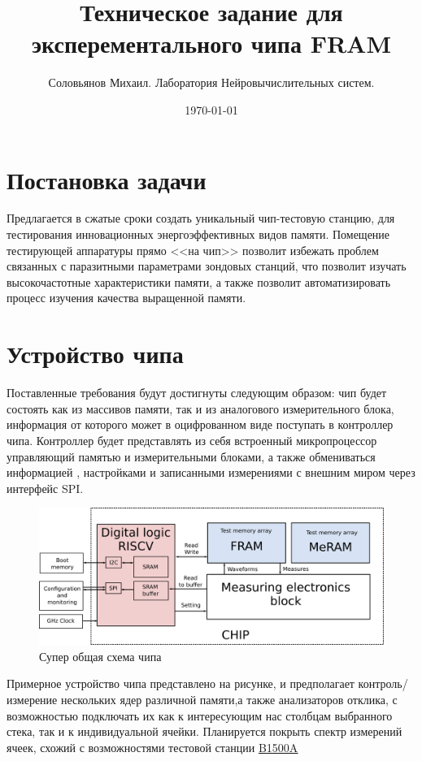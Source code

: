 \documentclass[a4paper,12pt]{article} %
\author{Соловьянов Михаил. Лаборатория Нейровычислительных систем.}
\title{Техническое задание для эксперементального чипа FRAM}
\date{\today}
\newcommand{\link}[2]{\underline{\href{#1}{#2} }}
\begin{document}
\thispagestyle{fancy}
\maketitle



\section{ Постановка задачи}


Предлагается в сжатые сроки создать уникальный чип-тестовую станцию, для тестирования инновационных энергоэффективных видов памяти. Помещение тестирующей аппаратуры прямо <<на чип>> позволит избежать проблем связанных с паразитными  параметрами зондовых станций, что позволит изучать высокочастотные характеристики памяти, а также позволит автоматизировать процесс изучения качества выращенной памяти. 

\section{Устройство чипа}

Поставленные требования будут достигнуты следующим образом: чип будет состоять как из массивов памяти, так и из аналогового измерительного блока, информация от которого может в оцифрованном виде поступать в контроллер чипа. Контроллер будет представлять из себя встроенный микропроцессор управляющий памятью и измерительными блоками, а также обмениваться информацией , настройками и записанными измерениями с внешним миром через интерфейс SPI. 
\begin{figure}[h]
\centering
\includegraphics[width=\textwidth]{top.png}
\caption{Супер общая схема чипа}
\end{figure}

Примерное устройство чипа представлено на рисунке, и предполагает контроль/измерение нескольких ядер различной памяти,а также анализаторов отклика, с возможностью подключать их как к интересующим нас столбцам выбранного стека, так и к индивидуальной ячейки. Планируется покрыть спектр измерений ячеек, схожий с возможностями тестовой станции \link{https://www.keysight.com/ru/ru/assets/7018-01289/data-sheets/5989-2785.pdf}{B1500A} 
\end{document}
